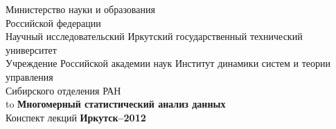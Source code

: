 \documentclass[12pt, openany, twoside]{book} %
\begin{document}
\def\chaptername{Тема}
\def\thechapter{\Roman{chapter}}
\def\thefigure{\arabic{section}.\arabic{figure}}
\def\thetable{\arabic{section}.\arabic{table}}
\fancyhf{} %
\fancyhead[RE]{\slshape \leftmark}
\fancyhead[LO]{\slshape \rightmark}
\fancyhead[RO,LE]{\slshape \thepage}
\renewcommand{\headrulewidth}{1pt}
\renewcommand{\footrulewidth}{0pt}%
\pagestyle{fancy}
\begin{titlepage}
\thispagestyle{empty}
\begin{center}
Министерство науки и образования\\
Российской федерации\\
{\sc Научный исследовательский Иркутский государственный технический университет}\\[0.5em]

{\sc Учреждение Российской академии наук Институт динамики систем и теории управления}\\
{\sc Сибирского отделения РАН}\\
\vfill
 \hbox to \linewidth{\hfill Е.А.~Черкашин}
 \vfill
{\large\bf Многомерный статистический анализ данных}\\
{Конспект лекций}
\vfill
\vfill
\vfill
 {\bf Иркутск--2012}
\end{center}
\end{titlepage}
\end{document}
